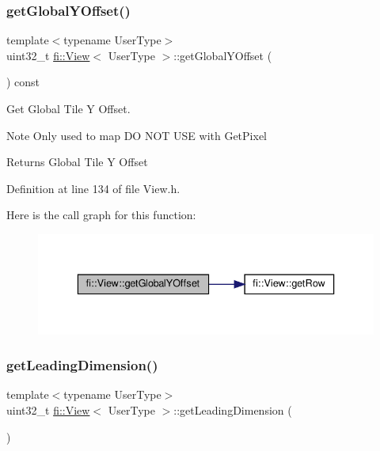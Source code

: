 \subsubsection{\texorpdfstring{get\+Global\+Y\+Offset()}{getGlobalYOffset()}}
{\footnotesize\ttfamily template$<$typename User\+Type$>$ \\
uint32\+\_\+t \hyperlink{classfi_1_1View}{fi\+::\+View}$<$ User\+Type $>$\+::get\+Global\+Y\+Offset (\begin{DoxyParamCaption}{ }\end{DoxyParamCaption}) const\hspace{0.3cm}{\ttfamily [inline]}}



Get Global Tile Y Offset. 

\begin{DoxyNote}{Note}
Only used to map DO N\+OT U\+SE with Get\+Pixel 
\end{DoxyNote}
\begin{DoxyReturn}{Returns}
Global Tile Y Offset 
\end{DoxyReturn}


Definition at line 134 of file View.\+h.

Here is the call graph for this function\+:
\nopagebreak
\begin{figure}[H]
\begin{center}
\leavevmode
\includegraphics[width=336pt]{d5/dd4/classfi_1_1View_a6cb46dcea151973eb4ebc0160586b16e_cgraph}
\end{center}
\end{figure}
\mbox{\label{classfi_1_1View_aafc262cff3e6af06f7c626bc4a0da4cf}} 
\subsubsection{\texorpdfstring{get\+Leading\+Dimension()}{getLeadingDimension()}}
{\footnotesize\ttfamily template$<$typename User\+Type$>$ \\
uint32\+\_\+t \hyperlink{classfi_1_1View}{fi\+::\+View}$<$ User\+Type $>$\+::get\+Leading\+Dimension (\begin{DoxyParamCaption}{ }\end{DoxyParamCaption})\hspace{0.3cm}{\ttfamily [inline]}}



